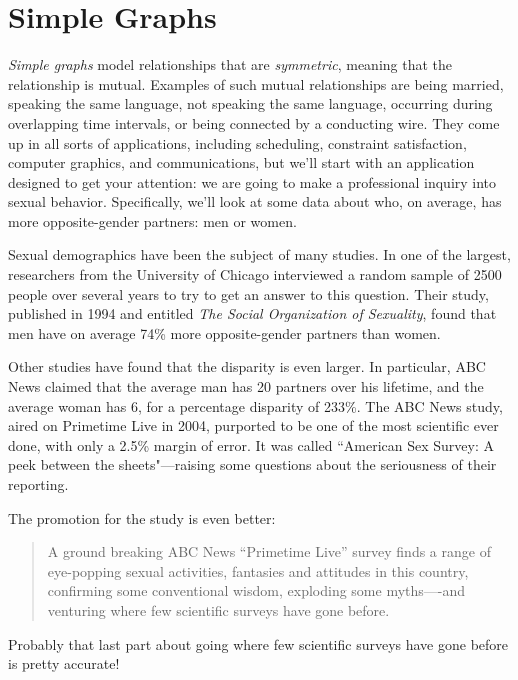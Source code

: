\chapter{Simple Graphs}\label{simple_graphs_chap}

\emph{Simple graphs}%
model relationships that are \emph{symmetric},%
meaning that the relationship is mutual.
Examples of such mutual relationships are being married, speaking the
same language, not speaking the same language, occurring during
overlapping time intervals, or being connected by a conducting wire.
They come up in all sorts of applications, including scheduling,
constraint satisfaction, computer graphics, and communications, but
we'll start with an application designed to get your attention: we are
going to make a professional inquiry into sexual behavior.  Specifically,
we'll look at some data about who, on average, has more
opposite-gender partners: men or women.

\iffalse
An example is shown in
Figure~\ref{fig:graph-example}.  The dots are called \emph{nodes} (or
\emph{vertices}) and the lines are called \emph{edges}.
\fi

Sexual demographics have been the subject of many studies.  In one of
the largest, researchers from the University of Chicago interviewed a
random sample of 2500 people over several years to try to get an
answer to this question.  Their study, published in 1994 and entitled
\emph{The Social Organization of Sexuality}, found that men have on
average 74\% more opposite-gender partners than women.

Other studies have found that the disparity is even larger.  In
particular, ABC News claimed that the average man has 20 partners over
his lifetime, and the average woman has 6, for a percentage disparity
of 233\%.  The ABC News study, aired on Primetime Live in 2004,
purported to be one of the most scientific ever done, with only a
2.5\% margin of error.  It was called ``American Sex Survey: A peek
between the sheets"---raising some questions about the seriousness of
their reporting.
\begin{editingnotes}
The promotion for the study is even better:
\begin{quote} 
A ground breaking ABC News ``Primetime Live'' survey finds a range of
eye-popping sexual activities, fantasies and attitudes in this country,
confirming some conventional wisdom, exploding some myths----and venturing
where few scientific surveys have gone before.
\end{quote}
Probably that last part about going where few scientific surveys have gone
before is pretty accurate!
\end{editingnotes}

